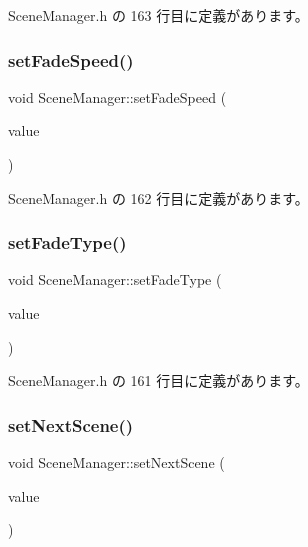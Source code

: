  Scene\+Manager.\+h の 163 行目に定義があります。

\mbox{\label{class_scene_manager_af3b87ef963b80aa1942a2f804f61bdeb}} 
\subsubsection{\texorpdfstring{set\+Fade\+Speed()}{setFadeSpeed()}}
{\footnotesize\ttfamily void Scene\+Manager\+::set\+Fade\+Speed (\begin{DoxyParamCaption}\item[{float}]{value }\end{DoxyParamCaption})\hspace{0.3cm}{\ttfamily [inline]}}



 Scene\+Manager.\+h の 162 行目に定義があります。

\mbox{\label{class_scene_manager_a95bb32ee4d3461bf56381d288a98c61b}} 
\subsubsection{\texorpdfstring{set\+Fade\+Type()}{setFadeType()}}
{\footnotesize\ttfamily void Scene\+Manager\+::set\+Fade\+Type (\begin{DoxyParamCaption}\item[{\mbox{\hyperlink{class_fade_ac06f27215b454aa05b93c236476d6e80}{Fade\+::\+Type}}}]{value }\end{DoxyParamCaption})\hspace{0.3cm}{\ttfamily [inline]}}



 Scene\+Manager.\+h の 161 行目に定義があります。

\mbox{\label{class_scene_manager_a208cc1690dcb260ae7fb94d13118f6ce}} 
\subsubsection{\texorpdfstring{set\+Next\+Scene()}{setNextScene()}}
{\footnotesize\ttfamily void Scene\+Manager\+::set\+Next\+Scene (\begin{DoxyParamCaption}\item[{\mbox{\hyperlink{class_scene_base}{Scene\+Base}} $\ast$}]{value }\end{DoxyParamCaption})}



